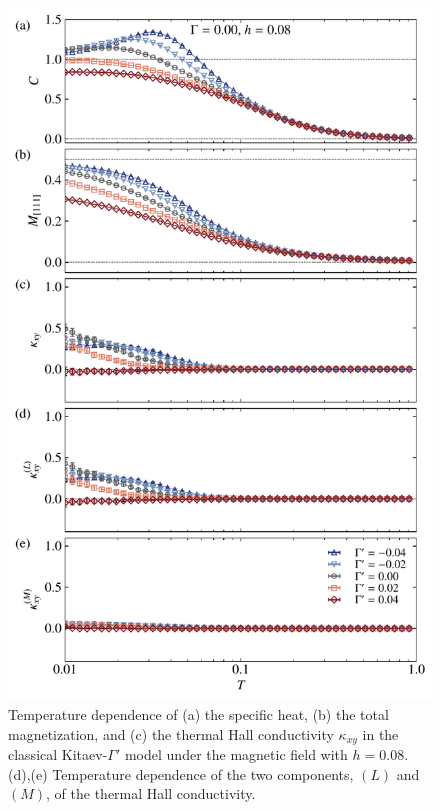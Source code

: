 \documentclass[reprint,amsmath,amssymb,aps,prx]{revtex4-2}
\begin{document}
\begin{figure}[tbh] 
\begin{center} 
\includegraphics[width=0.9\linewidth]{fig_K-1.0_G0.00_h0.08.pdf}
\vspace{-0.5cm} 
\caption{Temperature dependence of (a) the specific heat, (b) the total magnetization, and
(c) the thermal Hall conductivity $\kappa_{xy}$ in the classical Kitaev-$\Gamma'$ model under the magnetic field with $h=0.08$.
(d),(e) Temperature dependence of the two components, $(L)$ and $(M)$, of the thermal Hall conductivity.}
\label{fig_classical_gpdep008}
\end{center}
\end{figure}
\end{document}
